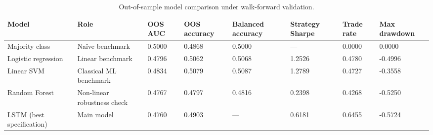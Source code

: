 \begin{table}
\caption{Out-of-sample model comparison under walk-forward validation.}
\label{tab:model_comparison}
\begin{tabular}{llllllll}
\toprule
Model & Role & OOS AUC & OOS accuracy & Balanced accuracy & Strategy Sharpe & Trade rate & Max drawdown \\
\midrule
Majority class & Naïve benchmark & 0.5000 & 0.4868 & 0.5000 & — & 0.0000 & 0.0000 \\
Logistic regression & Linear benchmark & 0.4796 & 0.5062 & 0.5068 & 1.2526 & 0.4780 & -0.4996 \\
Linear SVM & Classical ML benchmark & 0.4834 & 0.5079 & 0.5087 & 1.2789 & 0.4727 & -0.3558 \\
Random Forest & Non-linear robustness check & 0.4767 & 0.4797 & 0.4816 & 0.2398 & 0.4268 & -0.5250 \\
LSTM (best specification) & Main model & 0.4760 & 0.4903 & — & 0.6181 & 0.6455 & -0.5724 \\
\bottomrule
\end{tabular}
\end{table}
